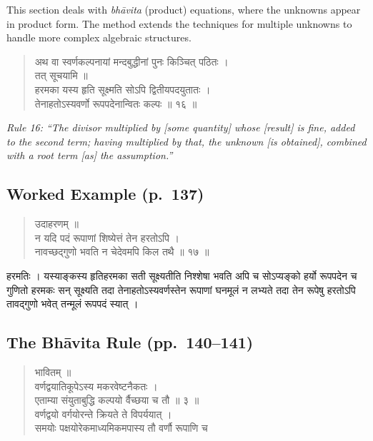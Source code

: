 \documentclass[11pt,a4paper]{article}
\newcommand{\cnote}[1]{\textcolor{notecolor}{\textit{#1}}}
\newcommand{\dev}[1]{{\devanagarifont #1}}
\newenvironment{sanskritverse}{%
  \begin{quote}
}{%
  \end{quote}
}
\begin{document}
This section deals with \textit{bhāvita} (product) equations, where the unknowns appear in product form. The method extends the techniques for multiple unknowns to handle more complex algebraic structures.

\begin{sanskritverse}
\dev{%
अथ वा स्वर्णकल्पनायां मन्दबुद्धीनां पुनः किञ्चित् पठितः ।\\
तत् सूचयामि ॥\\[0.5em]
हरमका यस्य हृति सूक्ष्मति सोऽपि द्वितीयपदयुतातः ।\\
तेनाहतोऽस्यवर्णो रूपपदेनान्वितः कल्पः ॥ १६ ॥}
\end{sanskritverse}

\cnote{Rule 16: ``The divisor multiplied by [some quantity] whose [result] is fine, added to the second term; having multiplied by that, the unknown [is obtained], combined with a root term [as] the assumption.''}

\subsection*{Worked Example (p.\ 137)}

\begin{sanskritverse}
\dev{%
उदाहरणम् ॥\\[0.3em]
न यदि पदं रूपाणां शिष्येत्तं तेन हरतोऽपि ।\\
नावच्छद्‌गुणो भवति न चेदेवमपि किल तथै ॥ १७ ॥}
\end{sanskritverse}

\dev{%
हरमतिः । यस्याङ्कस्य हृतिहरमका सती सूक्ष्यतीति निश्शेषा भवति अपि च सोऽप्यङ्को हर्यो रूपपदेन च गुणितो हरमकः सन् सूक्ष्यति तदा तेनाहतोऽस्यवर्णस्तेन रूपाणां घनमूलं न लभ्यते तदा तेन रूपेषु हरतोऽपि तावद्‌गुणो भवेत् तन्मूलं रूपपदं स्यात् ।}

\subsection{The Bhāvita Rule (pp.\ 140--141)}

\begin{sanskritverse}
\dev{%
भावितम् ॥\\[0.5em]
वर्णद्वयातिकूपेऽस्य मकरवेष्टनैकतः ।\\
एताम्या संयुताबुद्धि कल्पयो र्वैच्छया च तौ ॥ ३ ॥\\[0.5em]
वर्णद्वयो वर्गयोरन्ते क्रियते ते विपर्ययात् ।\\
समयोः पक्षयोरेकमाध्यमिकमपास्य तौ वर्णौ रूपाणि च}
\end{sanskritverse}
\end{document}
